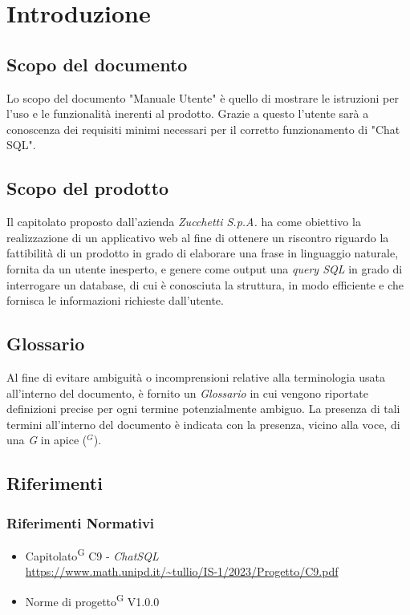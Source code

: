 \documentclass[5pt]{article}
\begin{document}
	
	
	\pagebreak
	\tableofcontents
	\listoffigures
	\pagebreak
	
	
	\section{Introduzione}
		\subsection{Scopo del documento}
			Lo scopo del documento "Manuale Utente" è quello di mostrare le istruzioni per l'uso e le funzionalità inerenti al prodotto. Grazie a questo l'utente sarà a conoscenza dei requisiti minimi necessari per il corretto funzionamento di "Chat SQL".

		\subsection{Scopo del prodotto}
			Il capitolato proposto dall'azienda \textit{Zucchetti S.p.A.} ha come obiettivo la realizzazione di un applicativo web al fine di ottenere un riscontro riguardo la fattibilità di un prodotto in grado di elaborare una frase in linguaggio naturale, fornita da un utente inesperto, e genere come output una \textit{query SQL} in grado di interrogare un database, di cui è conosciuta la struttura, in modo efficiente e che fornisca le informazioni richieste dall'utente.

        \subsection{Glossario}
     		Al fine di evitare ambiguità o incomprensioni relative alla terminologia usata all'interno del documento, è fornito un \textit{Glossario} in cui vengono riportate definizioni precise per ogni termine potenzialmente ambiguo. La presenza di tali termini all'interno del documento è indicata con la presenza, vicino alla voce, di una \textit{G} in apice ($^G$). 

        \subsection{Riferimenti}
        
			\subsubsection{Riferimenti Normativi}
			\begin{itemize}
				\item Capitolato\textsuperscript{G} C9 - \textit{ChatSQL} \\ \url{https://www.math.unipd.it/~tullio/IS-1/2023/Progetto/C9.pdf} 
				\item Norme di progetto\textsuperscript{G} V1.0.0
			\end{itemize}
			
\end{document}
